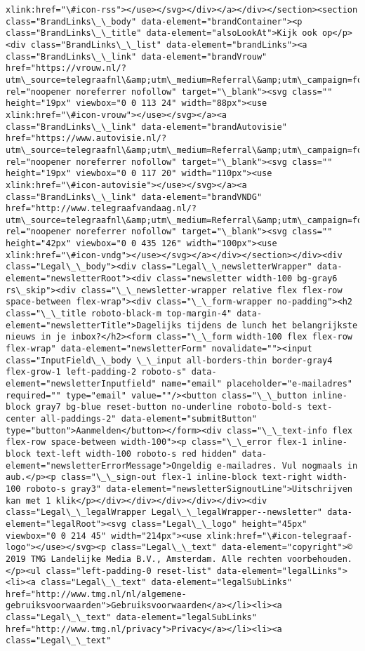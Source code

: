 \documentclass[11pt]{article}
\begin{document}
\begin{Verbatim}[commandchars=\\\{\}]
xlink:href="\#icon-rss"></use></svg></div></a></div></section><section class="BrandLinks\_\_body" data-element="brandContainer"><p class="BrandLinks\_\_title" data-element="alsoLookAt">Kijk ook op</p><div class="BrandLinks\_\_list" data-element="brandLinks"><a class="BrandLinks\_\_link" data-element="brandVrouw" href="https://vrouw.nl/?utm\_source=telegraafnl\&amp;utm\_medium=Referral\&amp;utm\_campaign=footer" rel="noopener noreferrer nofollow" target="\_blank"><svg class="" height="19px" viewbox="0 0 113 24" width="88px"><use xlink:href="\#icon-vrouw"></use></svg></a><a class="BrandLinks\_\_link" data-element="brandAutovisie" href="https://www.autovisie.nl/?utm\_source=telegraafnl\&amp;utm\_medium=Referral\&amp;utm\_campaign=footer" rel="noopener noreferrer nofollow" target="\_blank"><svg class="" height="19px" viewbox="0 0 117 20" width="110px"><use xlink:href="\#icon-autovisie"></use></svg></a><a class="BrandLinks\_\_link" data-element="brandVNDG" href="http://www.telegraafvandaag.nl/?utm\_source=telegraafnl\&amp;utm\_medium=Referral\&amp;utm\_campaign=footer" rel="noopener noreferrer nofollow" target="\_blank"><svg class="" height="42px" viewbox="0 0 435 126" width="100px"><use xlink:href="\#icon-vndg"></use></svg></a></div></section></div><div class="Legal\_\_body"><div class="Legal\_\_newsletterWrapper" data-element="newsletterRoot"><div class="newsletter width-100 bg-gray6 rs\_skip"><div class="\_\_newsletter-wrapper relative flex flex-row space-between flex-wrap"><div class="\_\_form-wrapper no-padding"><h2 class="\_\_title roboto-black-m top-margin-4" data-element="newsletterTitle">Dagelijks tijdens de lunch het belangrijkste nieuws in je inbox?</h2><form class="\_\_form width-100 flex flex-row flex-wrap" data-element="newsletterForm" novalidate=""><input class="InputField\_\_body \_\_input all-borders-thin border-gray4 flex-grow-1 left-padding-2 roboto-s" data-element="newsletterInputfield" name="email" placeholder="e-mailadres" required="" type="email" value=""/><button class="\_\_button inline-block gray7 bg-blue reset-button no-underline roboto-bold-s text-center all-paddings-2" data-element="submitButton" type="button">Aanmelden</button></form><div class="\_\_text-info flex flex-row space-between width-100"><p class="\_\_error flex-1 inline-block text-left width-100 roboto-s red hidden" data-element="newsletterErrorMessage">Ongeldig e-mailadres. Vul nogmaals in aub.</p><p class="\_\_sign-out flex-1 inline-block text-right width-100 roboto-s gray3" data-element="newsletterSignoutLine">Uitschrijven kan met 1 klik</p></div></div></div></div></div><div class="Legal\_\_legalWrapper Legal\_\_legalWrapper--newsletter" data-element="legalRoot"><svg class="Legal\_\_logo" height="45px" viewbox="0 0 214 45" width="214px"><use xlink:href="\#icon-telegraaf-logo"></use></svg><p class="Legal\_\_text" data-element="copyright">© 2019 TMG Landelijke Media B.V., Amsterdam. Alle rechten voorbehouden.</p><ul class="left-padding-0 reset-list" data-element="legalLinks"><li><a class="Legal\_\_text" data-element="legalSubLinks" href="http://www.tmg.nl/nl/algemene-gebruiksvoorwaarden">Gebruiksvoorwaarden</a></li><li><a class="Legal\_\_text" data-element="legalSubLinks" href="http://www.tmg.nl/privacy">Privacy</a></li><li><a class="Legal\_\_text" 
\end{Verbatim}
\end{document}
